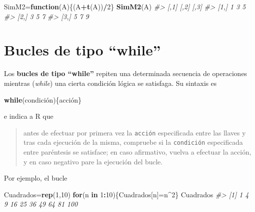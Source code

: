 \documentclass[
]{book}
\newenvironment{Shaded}{\begin{snugshade}}{\end{snugshade}}
\newcommand{\CommentTok}[1]{\textcolor[rgb]{0.56,0.35,0.01}{\textit{#1}}}
\newcommand{\ControlFlowTok}[1]{\textcolor[rgb]{0.13,0.29,0.53}{\textbf{#1}}}
\newcommand{\DecValTok}[1]{\textcolor[rgb]{0.00,0.00,0.81}{#1}}
\newcommand{\KeywordTok}[1]{\textcolor[rgb]{0.13,0.29,0.53}{\textbf{#1}}}
\newcommand{\NormalTok}[1]{#1}
\newcommand{\OperatorTok}[1]{\textcolor[rgb]{0.81,0.36,0.00}{\textbf{#1}}}
\theoremstyle{definition}
\theoremstyle{definition}
\theoremstyle{definition}
\theoremstyle{remark}
\begin{document}
\begin{Shaded}
\begin{Highlighting}[]
\NormalTok{SimM2=}\ControlFlowTok{function}\NormalTok{(A)\{(A}\OperatorTok{+}\KeywordTok{t}\NormalTok{(A))}\OperatorTok{/}\DecValTok{2}\NormalTok{\}}
\KeywordTok{SimM2}\NormalTok{(A)}
\CommentTok{\#\textgreater{}      [,1] [,2] [,3]}
\CommentTok{\#\textgreater{} [1,]    1    3    5}
\CommentTok{\#\textgreater{} [2,]    3    5    7}
\CommentTok{\#\textgreater{} [3,]    5    7    9}
\end{Highlighting}
\end{Shaded}

\hypertarget{bucles-de-tipo-while}{%
\section{Bucles de tipo ``while''}\label{bucles-de-tipo-while}}

Los \textbf{bucles de tipo ``while''} repiten una determinada secuencia de operaciones mientras (\emph{while}) una cierta condición lógica se satisfaga. Su sintaxis es

\begin{Shaded}
\begin{Highlighting}[]
\ControlFlowTok{while}\NormalTok{(condición)\{acción\}}
\end{Highlighting}
\end{Shaded}

e indica a R que

\begin{quote}
antes de efectuar por primera vez la \texttt{acción} especificada entre las llaves y tras cada ejecución de la misma, compruebe si la \texttt{condición} especificada entre paréntesis se satisface; en caso afirmativo, vuelva a efectuar la acción, y en caso negativo pare la ejecución del bucle.
\end{quote}

Por ejemplo, el bucle

\begin{Shaded}
\begin{Highlighting}[]
\NormalTok{Cuadrados=}\KeywordTok{rep}\NormalTok{(}\DecValTok{1}\NormalTok{,}\DecValTok{10}\NormalTok{)}
\ControlFlowTok{for}\NormalTok{(n }\ControlFlowTok{in} \DecValTok{1}\OperatorTok{:}\DecValTok{10}\NormalTok{)\{Cuadrados[n]=n}\OperatorTok{\^{}}\DecValTok{2}\NormalTok{\}}
\NormalTok{Cuadrados}
\CommentTok{\#\textgreater{}  [1]   1   4   9  16  25  36  49  64  81 100}
\end{Highlighting}
\end{Shaded}
\end{document}
